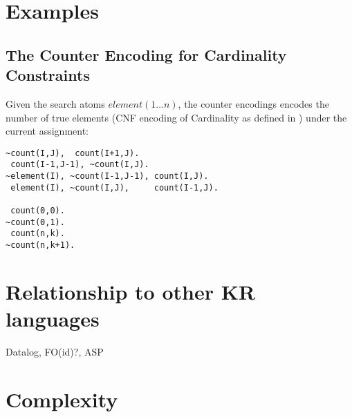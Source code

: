 \documentclass[conference]{IEEEtran}
\begin{document}
\section{Examples}

\subsection{The Counter Encoding for Cardinality Constraints}


Given the search atoms $element(1\ldots n)$, the counter encodings encodes the
number of true elements (CNF encoding of Cardinality as defined in \cite{Sinz05})
under the current assignment:

\begin{lstlisting}
~count(I,J),  count(I+1,J).
 count(I-1,J-1), ~count(I,J).
~element(I), ~count(I-1,J-1), count(I,J).
 element(I), ~count(I,J),     count(I-1,J).

 count(0,0).
~count(0,1).
 count(n,k).
~count(n,k+1).
\end{lstlisting}

\section{Relationship to other KR languages}

Datalog, FO(id)?, ASP

\section{Complexity}



\end{document}
